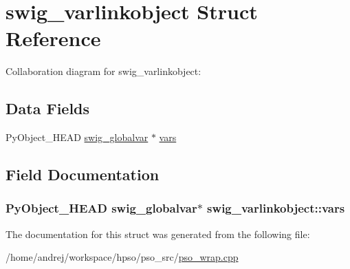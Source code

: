 \hypertarget{structswig__varlinkobject}{
\section{swig\_\-varlinkobject Struct Reference}
\label{structswig__varlinkobject}
}
Collaboration diagram for swig\_\-varlinkobject:\subsection*{Data Fields}
\begin{CompactItemize}
\item 
PyObject\_\-HEAD \hyperlink{structswig__globalvar}{swig\_\-globalvar} $\ast$ \hyperlink{structswig__varlinkobject_8cf96d999cdf0b28a0e90ccb6804c9bd}{vars}
\end{CompactItemize}


\subsection{Field Documentation}
\hypertarget{structswig__varlinkobject_8cf96d999cdf0b28a0e90ccb6804c9bd}{
\subsubsection{\setlength{\rightskip}{0pt plus 5cm}PyObject\_\-HEAD {\bf swig\_\-globalvar}$\ast$ {\bf swig\_\-varlinkobject::vars}}}
\label{structswig__varlinkobject_8cf96d999cdf0b28a0e90ccb6804c9bd}




The documentation for this struct was generated from the following file:\begin{CompactItemize}
\item 
/home/andrej/workspace/hpso/pso\_\-src/\hyperlink{pso__wrap_8cpp}{pso\_\-wrap.cpp}\end{CompactItemize}
